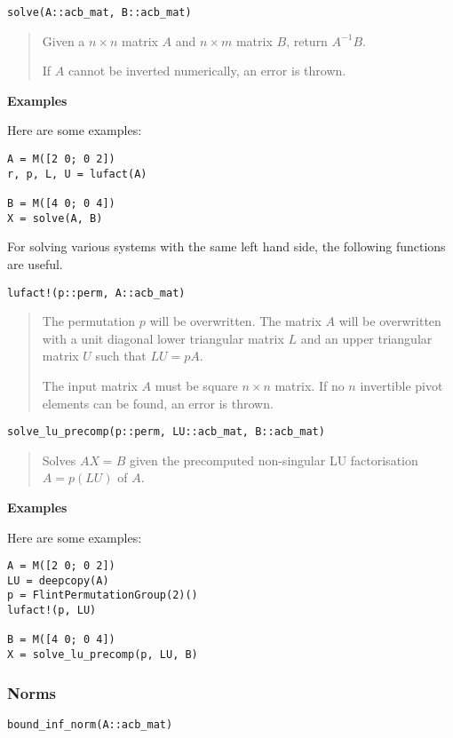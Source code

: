 \documentclass[a4paper,10pt]{article}
\newcommand{\desc}[1]{\vspace{-3mm}\begin{quote}#1\end{quote}}
\begin{document}
{{\begin{lstlisting}
solve(A::acb_mat, B::acb_mat)
\end{lstlisting}

\desc{Given a $n \times n$ matrix $A$ and $n \times m$ matrix $B$, return $A^{-1}B$.

If $A$ cannot be inverted numerically, an error is thrown.}

\textbf{Examples}

Here are some examples:

\begin{lstlisting}
A = M([2 0; 0 2])
r, p, L, U = lufact(A)

B = M([4 0; 0 4])
X = solve(A, B)
\end{lstlisting}

For solving various systems with the same left hand side, the following functions
are useful.

\begin{lstlisting}
lufact!(p::perm, A::acb_mat)
\end{lstlisting}

\desc{The permutation $p$ will be overwritten.
The matrix $A$ will be overwritten with a unit diagonal lower triangular matrix $L$
and an upper triangular matrix $U$ such that $LU = pA$.

The input matrix $A$ must be square $n\times n$ matrix. If no $n$ invertible
pivot elements can be found, an error is thrown.}

\begin{lstlisting}
solve_lu_precomp(p::perm, LU::acb_mat, B::acb_mat)
\end{lstlisting}

\desc{Solves $AX = B$ given the precomputed non-singular LU factorisation $A = p(LU)$ of $A$.}

\textbf{Examples}

Here are some examples:

\begin{lstlisting}
A = M([2 0; 0 2])
LU = deepcopy(A)
p = FlintPermutationGroup(2)()
lufact!(p, LU)

B = M([4 0; 0 4])
X = solve_lu_precomp(p, LU, B)
\end{lstlisting}

\subsubsection{Norms}

\begin{lstlisting}
bound_inf_norm(A::acb_mat)
\end{lstlisting}

}}
\end{document}
